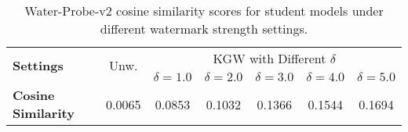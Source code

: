 \begin{table}[t]
\caption{Water-Probe-v2 cosine similarity scores for student models under different watermark strength settings.}
\centering
\begin{tabular}{lcccccc}
\toprule
\multirow{2}{*}{\textbf{Settings}} & \multirow{2}{*}{Unw.} & \multicolumn{5}{c}{KGW with Different $\delta$} \\
\cmidrule(lr){3-7}
 & & $\delta=1.0$ & $\delta=2.0$ & $\delta=3.0$ & $\delta=4.0$ & $\delta=5.0$ \\
\midrule
\textbf{Cosine Similarity} & 0.0065 & 0.0853 & 0.1032 & 0.1366 & 0.1544 & 0.1694 \\
\bottomrule
\end{tabular}
\label{tab:waterprobe}
\end{table}
